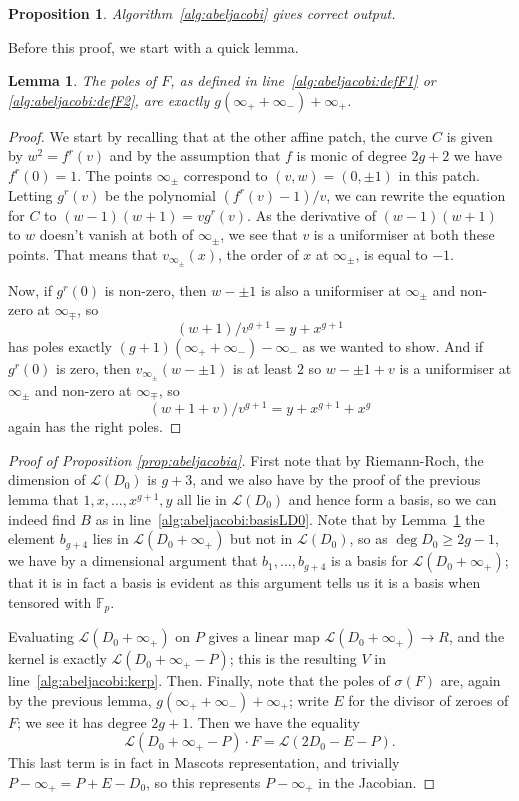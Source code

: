 \documentclass{article}
\newcommand{\Lcal}{\mathcal{L}}
\newcommand{\F}{\mathbb{F}}
\theoremstyle{plain}
\newtheorem{lem}[thm]{Lemma} %
\newtheorem{prop}[thm]{Proposition} %
\theoremstyle{definition}
\theoremstyle{remark}
\begin{document}
\begin{prop}
\label{prop:abeljacobi}
Algorithm~\ref{alg:abeljacobi} gives correct output.
\end{prop}
Before this proof, we start with a quick lemma.
\begin{lem}
\label{lem:poles2d0i+}
The poles of $F$, as defined in line~\ref{alg:abeljacobi:defF1} or \ref{alg:abeljacobi:defF2}, are exactly $g(\infty_+ + \infty_-) + \infty_+$. 
\end{lem}
\begin{proof}
We start by recalling that at the other affine patch, the curve $C$ is given by $w^2 = f^r(v)$ and by the assumption that $f$ is monic of degree $2g+2$ we have $f^r(0) = 1$. The points $\infty_\pm$ correspond to $(v,w) = (0,\pm 1)$ in this patch. Letting $g^r(v)$ be the polynomial $(f^r(v)-1)/v$, we can rewrite the equation for $C$ to $(w-1)(w+1) = vg^r(v)$. As the derivative of $(w-1)(w+1)$ to $w$ doesn't vanish at both of $\infty_\pm$, we see that $v$ is a uniformiser at both these points. That means that $v_{\infty_\pm}(x)$, the order of $x$ at $\infty_\pm$, is equal to $-1$.

Now, if $g^r(0)$ is non-zero, then $w- \pm 1$ is also a uniformiser at $\infty_\pm$ and non-zero at $\infty_\mp$, so \[(w+1)/v^{g+1} = y + x^{g+1}\] has poles exactly $(g+1)(\infty_+ + \infty_-) - \infty_-$ as we wanted to show.
And if $g^r(0)$ is zero, then $v_{\infty_\pm}(w-\pm1)$ is at least $2$ so $w-\pm 1 + v$ is a uniformiser at $\infty_\pm$ and non-zero at $\infty_\mp$, so \[(w+1+v)/v^{g+1} = y + x^{g+1} + x^{g}\] again has the right poles.
\end{proof}


\begin{proof}[Proof of Proposition \ref{prop:abeljacobia}]
First note that by Riemann-Roch, the dimension of $\Lcal(D_0)$ is $g + 3$, and we also have by the proof of the previous lemma that $1,x,\dots,x^{g+1},y$ all lie in $\Lcal(D_0)$ and hence form a basis, so we can indeed find $B$ as in line~\ref{alg:abeljacobi:basisLD0}. Note that by Lemma~\ref{lem:poles2d0i+} the element $b_{g+4}$ lies in $\Lcal(D_0 + \infty_+)$ but not in $\Lcal(D_0)$, so as $\deg D_0 \geq 2g-1$, we have by a dimensional argument that $b_1,\dots,b_{g+4}$ is a basis for $\Lcal(D_0 + \infty_+)$; that it is in fact a basis is evident as this argument tells us it is a basis when tensored with $\F_p$.

Evaluating $\Lcal(D_0 + \infty_+)$ on $P$ gives a linear map $\Lcal(D_0 + \infty_+) \to R$, and the kernel is exactly $\Lcal(D_0 + \infty_+ - P)$; this is the resulting $V$ in line~\ref{alg:abeljacobi:kerp}. Then. Finally, note that the poles of $\sigma(F)$ are, again by the previous lemma, $g(\infty_+ + \infty_-) + \infty_+$; write $E$ for the divisor of zeroes of $F$; we see it has degree $2g+1$. Then we have the equality \[\Lcal(D_0 + \infty_+-P) \cdot F = \Lcal(2D_0 - E - P).\]
This last term is in fact in Mascots representation, and trivially $P-\infty_+ = P + E - D_0$, so this represents $P-\infty_+$ in the Jacobian.
\end{proof}
\end{document}
